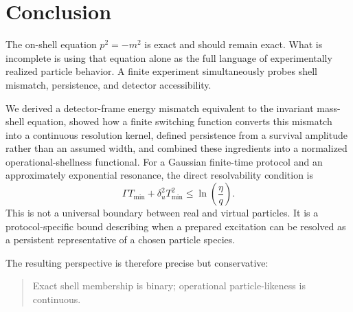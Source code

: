 \documentclass[11pt]{article}
\theoremstyle{remark}
\begin{document}
\section{Conclusion}

The on-shell equation $p^2=-m^2$ is exact and should remain exact. What is incomplete is using that equation alone as the full language of experimentally realized particle behavior. A finite experiment simultaneously probes shell mismatch, persistence, and detector accessibility.

We derived a detector-frame energy mismatch equivalent to the invariant mass-shell equation, showed how a finite switching function converts this mismatch into a continuous resolution kernel, defined persistence from a survival amplitude rather than an assumed width, and combined these ingredients into a normalized operational-shellness functional. For a Gaussian finite-time protocol and an approximately exponential resonance, the direct resolvability condition is
\begin{equation}
  \Gamma T_{\min}+\delta_u^2T_{\min}^2
  \le\ln\!\left(\frac{\eta}{q}\right).
\end{equation}
This is not a universal boundary between real and virtual particles. It is a protocol-specific bound describing when a prepared excitation can be resolved as a persistent representative of a chosen particle species.

The resulting perspective is therefore precise but conservative:
\begin{quote}
Exact shell membership is binary; operational particle-likeness is continuous.
\end{quote}
\end{document}
